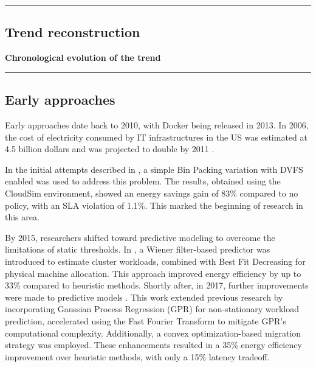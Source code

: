 {\color{gray}\hrule}
\begin{center}
\section{Trend reconstruction}
\textbf{Chronological evolution of the trend}
\bigskip
\end{center}
{\color{gray}\hrule}
\begin{multicols}{2}
\subsection{Early approaches}
Early approaches date back to 2010, with Docker being released in 2013. In 2006, the cost of electricity consumed by IT infrastructures in the US was estimated at 4.5 billion dollars and was projected to double by 2011 \cite{beloglazov_energy_2010}.

In the initial attempts described in \cite{beloglazov_energy_2010}, a simple Bin Packing variation with DVFS enabled was used to address this problem. The results, obtained using the CloudSim environment, showed an energy savings gain of 83\% compared to no policy, with an SLA violation of 1.1\%. This marked the beginning of research in this area.

By 2015, researchers shifted toward predictive modeling to overcome the limitations of static thresholds. In \cite{dabbagh_energy-efficient_2015},
a Wiener filter-based predictor was introduced to estimate cluster workloads, 
combined with Best Fit Decreasing for physical machine allocation.
This approach improved energy efficiency by up to 33\% compared to heuristic methods.
Shortly after, in 2017, further improvements were made to predictive models \cite{bui_energy_2017}.
This work extended previous research by incorporating Gaussian Process Regression (GPR) for non-stationary workload prediction,
accelerated using the Fast Fourier Transform to mitigate GPR's computational complexity.
Additionally, a convex optimization-based migration strategy was employed.
These enhancements resulted in a 35\% energy efficiency improvement over heuristic methods, with only a 15\% latency tradeoff.



\end{multicols}
